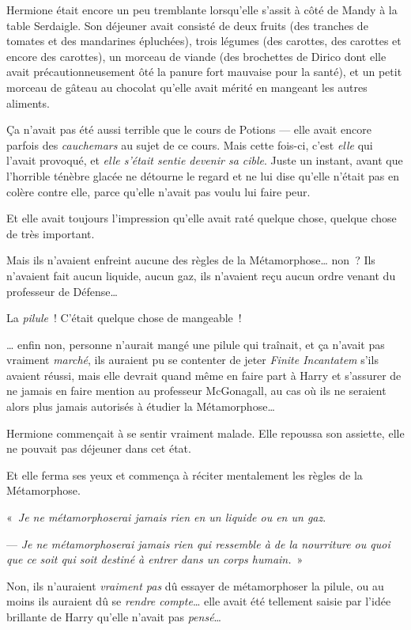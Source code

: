 \later

Hermione était encore un peu tremblante lorsqu'elle s'assit à côté de Mandy à la table Serdaigle. Son déjeuner avait consisté de deux fruits (des tranches de tomates et des mandarines épluchées), trois légumes (des carottes, des carottes et encore des carottes), un morceau de viande (des brochettes de Dirico dont elle avait précautionneusement ôté la panure fort mauvaise pour la santé), et un petit morceau de gâteau au chocolat qu'elle avait mérité en mangeant les autres aliments.

Ça n'avait pas été aussi terrible que le cours de Potions --- elle avait encore parfois des \emph{cauchemars} au sujet de ce cours. Mais cette fois-ci, c'est \emph{elle} qui l'avait provoqué, et \emph{elle s'était sentie devenir sa cible}. Juste un instant, avant que l'horrible ténèbre glacée ne détourne le regard et ne lui dise qu'elle n'était pas en colère contre elle, parce qu'elle n'avait pas voulu lui faire peur.

Et elle avait toujours l'impression qu'elle avait raté quelque chose, quelque chose de très important.

Mais ils n'avaient enfreint aucune des règles de la Métamorphose… non~? Ils n'avaient fait aucun liquide, aucun gaz, ils n'avaient reçu aucun ordre venant du professeur de Défense…

La \emph{pilule}~! C'était quelque chose de mangeable~!

… enfin non, personne n'aurait mangé une pilule qui traînait, et ça n'avait pas vraiment \emph{marché}, ils auraient pu se contenter de jeter \emph{Finite Incantatem} s'ils avaient réussi, mais elle devrait quand même en faire part à Harry et s'assurer de ne jamais en faire mention au professeur McGonagall, au cas où ils ne seraient alors plus jamais autorisés à étudier la Métamorphose…

Hermione commençait à se sentir vraiment malade. Elle repoussa son assiette, elle ne pouvait pas déjeuner dans cet état.

Et elle ferma ses yeux et commença à réciter mentalement les règles de la Métamorphose.

«~\emph{Je ne métamorphoserai jamais rien en un liquide ou en un gaz}.

--- \emph{Je ne métamorphoserai jamais rien qui ressemble à de la nourriture ou quoi que ce soit qui soit destiné à entrer dans un corps humain.}~»

Non, ils n'auraient \emph{vraiment pas} dû essayer de métamorphoser la pilule, ou au moins ils auraient dû se \emph{rendre compte}… elle avait été tellement saisie par l'idée brillante de Harry qu'elle n'avait pas \emph{pensé}…

